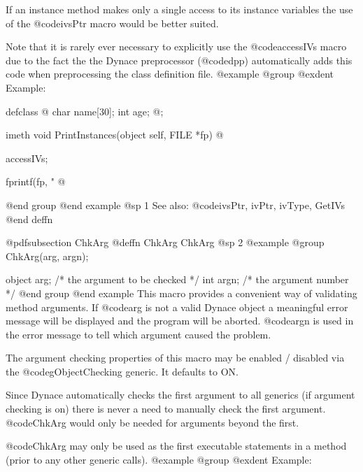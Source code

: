 If an instance method makes only a single access to its instance variables
the use of the @code{ivsPtr} macro would be better suited.

Note that it is rarely ever necessary to explicitly use the
@code{accessIVs} macro due to the fact the the Dynace preprocessor
(@code{dpp}) automatically adds this code when preprocessing the class
definition file.
@example
@group
@exdent Example:

defclass  @{
      char    name[30];
      int     age;
@};

imeth void    PrintInstances(object self, FILE *fp)
@{
      accessIVs;

      fprintf(fp, "%
@}
@end group
@end example
@sp 1
See also:  @code{ivsPtr, ivPtr, ivType, GetIVs}
@end deffn














@pdfsubsection {ChkArg}
@deffn {ChkArg} ChkArg
@sp 2
@example
@group
ChkArg(arg, argn);

object  arg;    /*  the argument to be checked  */
int     argn;   /*  the argument number         */
@end group
@end example
This macro provides a convenient way of validating method arguments.
If @code{arg} is not a valid Dynace object a meaningful error message
will be displayed and the program will be aborted.  @code{argn} is
used in the error message to tell which argument caused the problem.

The argument checking properties of this macro may be enabled / disabled
via the @code{gObjectChecking} generic.  It defaults to ON.

Since Dynace automatically checks the first argument to all generics (if
argument checking is on) there is never a need to manually check the
first argument.  @code{ChkArg} would only be needed for arguments
beyond the first.

@code{ChkArg} may only be used as the first executable statements in a
method (prior to any other generic calls).
@example
@group
@exdent Example:

